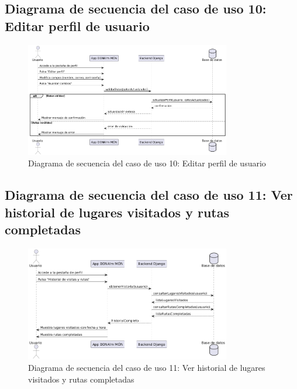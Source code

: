 \subsection{Diagrama de secuencia del caso de uso 10: Editar perfil de usuario}
\begin{figure}[H]
    \centering
    \includegraphics[width=0.8\textwidth]{figs/caso10.png}
    \caption{Diagrama de secuencia del caso de uso 10: Editar perfil de usuario}
\end{figure}

\subsection{Diagrama de secuencia del caso de uso 11: Ver historial de lugares visitados y rutas completadas}
\begin{figure}[H]
    \centering
    \includegraphics[width=0.8\textwidth]{figs/caso11.png}
    \caption{Diagrama de secuencia del caso de uso 11: Ver historial de lugares visitados y rutas completadas}
\end{figure}

